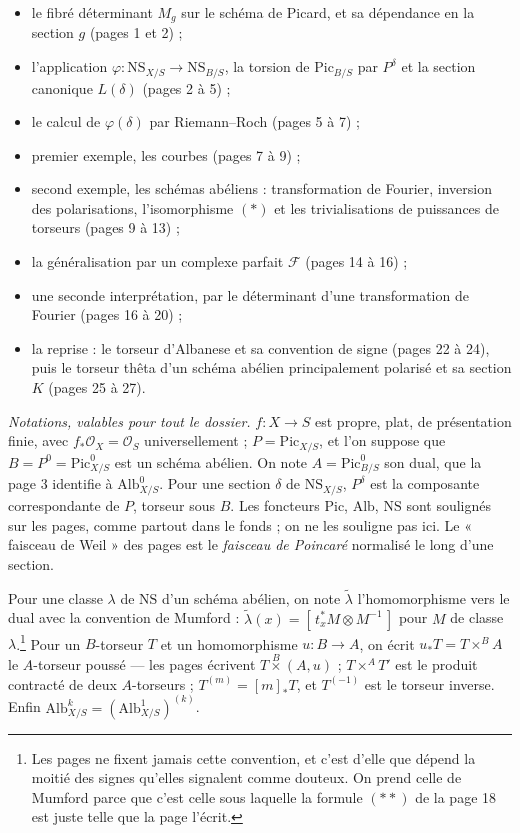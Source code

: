 \documentclass[11pt,a4paper]{article}
\begin{document}
\begin{itemize}
\item le fibré déterminant $M_g$ sur le schéma de Picard, et sa dépendance en
  la section $g$ (pages 1 et 2) ;
\item l'application $\varphi : \mathrm{NS}_{X/S} \to \mathrm{NS}_{B/S}$, la
  torsion de $\mathrm{Pic}_{B/S}$ par $P^{\delta}$ et la section canonique
  $L(\delta)$ (pages 2 à 5) ;
\item le calcul de $\varphi(\delta)$ par Riemann--Roch (pages 5 à 7) ;
\item premier exemple, les courbes (pages 7 à 9) ;
\item second exemple, les schémas abéliens : transformation de Fourier,
  inversion des polarisations, l'isomorphisme $(*)$ et les trivialisations de
  puissances de torseurs (pages 9 à 13) ;
\item la généralisation par un complexe parfait $\mathcal{F}$ (pages 14 à 16) ;
\item une seconde interprétation, par le déterminant d'une transformation de
  Fourier (pages 16 à 20) ;
\item la reprise : le torseur d'Albanese et sa convention de signe (pages 22 à
  24), puis le torseur thêta d'un schéma abélien principalement polarisé et sa
  section $K$ (pages 25 à 27).
\end{itemize}

\emph{Notations, valables pour tout le dossier.} $f : X \to S$ est propre,
plat, de présentation finie, avec $f_{*}\mathcal{O}_X = \mathcal{O}_S$
universellement ; $P = \mathrm{Pic}_{X/S}$, et l'on suppose que
$B = P^{0} = \mathrm{Pic}^{0}_{X/S}$ est un schéma abélien. On note
$A = \mathrm{Pic}^{0}_{B/S}$ son dual, que la page 3 identifie à
$\mathrm{Alb}^{0}_{X/S}$. Pour une section $\delta$ de
$\mathrm{NS}_{X/S}$, $P^{\delta}$ est la composante correspondante de $P$,
torseur sous $B$. Les foncteurs $\mathrm{Pic}$, $\mathrm{Alb}$, $\mathrm{NS}$
sont soulignés sur les pages, comme partout dans le fonds ; on ne les souligne
pas ici. Le « faisceau de Weil » des pages est le \emph{faisceau de Poincaré}
normalisé le long d'une section.

Pour une classe $\lambda$ de $\mathrm{NS}$ d'un schéma abélien, on note
$\tilde{\lambda}$ l'homomorphisme vers le dual avec la convention de Mumford :
$\tilde{\lambda}(x) = [\,t_x^{*}M \otimes M^{-1}\,]$ pour $M$ de classe
$\lambda$.\footnote{Les pages ne fixent jamais cette convention, et c'est
d'elle que dépend la moitié des signes qu'elles signalent comme douteux. On
prend celle de Mumford parce que c'est celle sous laquelle la formule $(**)$ de
la page 18 est juste telle que la page l'écrit.} Pour un $B$-torseur $T$ et un
homomorphisme $u : B \to A$, on écrit $u_{*}T = T \times^{B} A$ le
$A$-torseur poussé — les pages écrivent $T \overset{B}{\times} (A, u)$ ;
$T \times^{A} T'$ est le produit contracté de deux $A$-torseurs ;
$T^{(m)} = [m]_{*}T$, et $T^{(-1)}$ est le torseur inverse. Enfin
$\mathrm{Alb}^{k}_{X/S} = (\mathrm{Alb}^{1}_{X/S})^{(k)}$.
\end{document}
